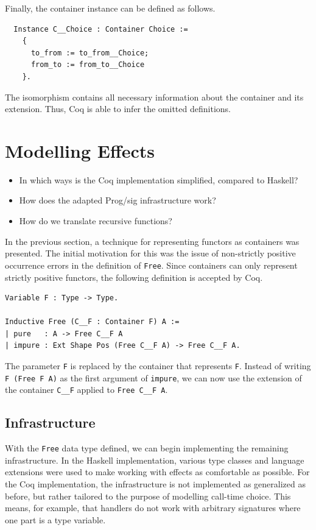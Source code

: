 \documentclass[a4paper, 11pt, fleqn, twoside]{scrreprt}
\newcommand{\cinl}[1]{\texttt{#1}}
\begin{document}
Finally, the container instance can be defined as follows.

\begin{verbatim}
  Instance C__Choice : Container Choice :=
    {
      to_from := to_from__Choice;
      from_to := from_to__Choice
    }.
\end{verbatim}

The isomorphism contains all necessary information about the container and its extension.
Thus, Coq is able to infer the omitted definitions.

\section{Modelling Effects}
\begin{itemize}
\item In which ways is the Coq implementation simplified, compared to Haskell?
\item How does the adapted Prog/sig infrastructure work?
\item How do we translate recursive functions?
\end{itemize}

In the previous section, a technique for representing functors as containers was presented.
The initial motivation for this was the issue of non-strictly positive occurrence errors in the definition of \cinl{Free}.
Since containers can only represent strictly positive functors, the following definition is accepted by Coq.

\begin{verbatim}
Variable F : Type -> Type.

Inductive Free (C__F : Container F) A :=
| pure   : A -> Free C__F A
| impure : Ext Shape Pos (Free C__F A) -> Free C__F A.
\end{verbatim}

The parameter \cinl{F} is replaced by the container that represents \cinl{F}.
Instead of writing \cinl{F (Free F A)} as the first argument of \cinl{impure}, we can now use the extension of the container \cinl{C__F} applied to \cinl{Free C__F A}.

\subsection{Infrastructure}

With the \cinl{Free} data type defined, we can begin implementing the remaining infrastructure. 
In the Haskell implementation, various type classes and language extensions were used to make working with effects as comfortable as possible.
For the Coq implementation, the infrastructure is not implemented as generalized as before, but rather tailored to the purpose of modelling call-time choice.
This means, for example, that handlers do not work with arbitrary signatures where one part is a type variable.
\end{document}
